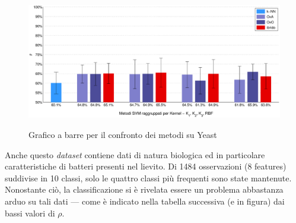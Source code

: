 \begin{figure}[H] %
 	\centering	
	
	\fboxsep=0mm%
	\fboxrule=1mm%

	 {
		\includegraphics[width=\textwidth]{img/BarYeast.eps}
	}	
	\caption{Grafico a barre per il confronto dei metodi su Yeast}
\end{figure}

Anche questo \textit{dataset} contiene dati di natura biologica ed in particolare caratteristiche di batteri presenti nel lievito. Di 1484 osservazioni (8 features) suddivise in 10 classi, solo le quattro classi più frequenti sono state mantenute. Nonostante ciò, la classificazione si è rivelata essere un problema abbastanza arduo su tali dati --- come è indicato nella tabella successiva (e in figura) dai bassi valori di $\rho$.

